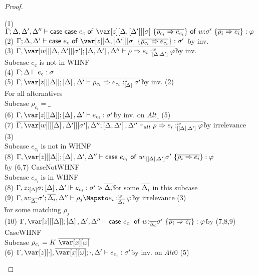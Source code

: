 
\CaseOfCaseTheorem

\begin{proof}~
\begin{tabbing}
    (1) $\G; \D, \D', \D'' \vdash \ccase{\ccase{e_c}{\zD~\{\ov{\rho_{c_i} \Rightarrow e_{c_i}}\}}}{w{:}\s'~\{\ov{\rho_i \Rightarrow e_i}\}} : \vp$\\
    (2) $\G; \D, \D' \vdash \ccase{e_c}{\zD~\{\ov{\rho_{c_i} \Rightarrow e_{c_i}}\}} : \s'$ \`by inv.\\
    (3) $\ov{\G, \var[w][\irr{\D,\D'}][\s']; \irr{\D,\D'},\D'' \vdash \rho \Rightarrow e_i :^w_{\irr{\D,\D'}} \vp}$\`by inv.\\
    Subcase $e_c$ is not in WHNF\\
    (4) $\Gamma;\Delta \vdash e_c : \sigma$\\
    (5) $\ov{\G,\var[z][\irr{\D}]; \irr{\D}, \D' \vdash \rho_{c_i} \Rightarrow e_{c_i} :^z_{\irr{\D}} \s'}$\`by inv. (2)\\
    For all alternatives\\
    Subcase $\rho_{c_i} = \_$\\
    (6) $\G,\var[z][\irr{\D}]; \irr{\D}, \D' \vdash e_{c_i} : \s'$\`by inv. on $Alt\_$ (5)\\
    (7) $\ov{\G, \var[w][\irr{\irr{\D},\D'}][\s'],\D''; \irr{\D,\D'},\D'' \vdash_{alt} \rho \Rightarrow e_i :^w_{\irr{\irr{\D},\D'}} \vp}$\`by irrelevance (3)\\
    Subcase $e_{c_i}$ is not in WHNF\\
    (8) $\G,\var[z][\irr{\D}]; \irr{\D},\D',\D'' \vdash \ccase{e_{c_i}}{w{:}_{\irr{\irr{\D},\D'}}\s'~\{\ov{\rho_i \Rightarrow e_i}\}} : \vp$\\\`by (6,7) CaseNotWHNF\\
    Subcase $e_{c_i}$ is in WHNF\\
    (8) $\Gamma,z{:}_{\left[\Delta\right]}\sigma; \left[\Delta\right],\Delta' \Vdash e_{c_i} : \sigma' \gtrdot \overline{\Delta_i}$\`for some $\overline{\Delta_i}$ in this subcase\\
    (9) $\G, w{:}_{\ov{\D_i}}\s'; \ov{\D_i}, \D'' \vdash \rho_j \Mapsto e_i :^w_{\ov{\D_i}} \vp$\`by irrelevance (3)\\\` for some matching $\rho_j$\\
    (10) $\G, \z[\irr{\D}]; \irr{\D},\D',\D'' \vdash \ccase{e_{c_i}}{w{:}_{\ov{\D_i}}\s'~\{\ov{\rho_i \Rightarrow e_i}\}} : \vp$\` by (7,8,9) CaseWHNF\\
    Subcase $\rho_{c_i} = K~\ov{\xo}$\\
    (6) $\G,\z[\cdot], \ov{\xo} ; \cdot, \D' \vdash e_{c_i} : \s'$\`by inv. on $Alt0$ (5)\\

\end{tabbing}
\end{proof}
